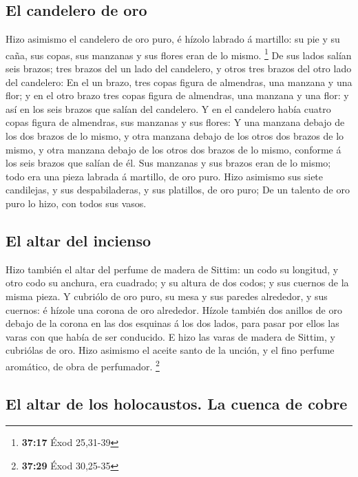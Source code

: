 \hypertarget{el-candelero-de-oro}{%
\subsection{El candelero de oro}\label{el-candelero-de-oro}}

 Hizo asimismo el candelero de oro puro, é hízolo labrado
á martillo: su pie y su caña, sus copas, sus manzanas y sus flores eran
de lo mismo. \footnote{\textbf{37:17} Éxod 25,31-39}  De
sus lados salían seis brazos; tres brazos del un lado del candelero, y
otros tres brazos del otro lado del candelero:  En el un
brazo, tres copas figura de almendras, una manzana y una flor; y en el
otro brazo tres copas figura de almendras, una manzana y una flor: y así
en los seis brazos que salían del candelero.  Y en el
candelero había cuatro copas figura de almendras, sus manzanas y sus
flores:  Y una manzana debajo de los dos brazos de lo
mismo, y otra manzana debajo de los otros dos brazos de lo mismo, y otra
manzana debajo de los otros dos brazos de lo mismo, conforme á los seis
brazos que salían de él.  Sus manzanas y sus brazos eran
de lo mismo; todo era una pieza labrada á martillo, de oro puro.
 Hizo asimismo sus siete candilejas, y sus
despabiladeras, y sus platillos, de oro puro;  De un
talento de oro puro lo hizo, con todos sus vasos.

\hypertarget{el-altar-del-incienso}{%
\subsection{El altar del incienso}\label{el-altar-del-incienso}}

 Hizo también el altar del perfume de madera de Sittim:
un codo su longitud, y otro codo su anchura, era cuadrado; y su altura
de dos codos; y sus cuernos de la misma pieza.  Y
cubriólo de oro puro, su mesa y sus paredes alrededor, y sus cuernos: é
hízole una corona de oro alrededor.  Hízole también dos
anillos de oro debajo de la corona en las dos esquinas á los dos lados,
para pasar por ellos las varas con que había de ser conducido.
 E hizo las varas de madera de Sittim, y cubriólas de
oro.  Hizo asimismo el aceite santo de la unción, y el
fino perfume aromático, de obra de perfumador. \footnote{\textbf{37:29}
  Éxod 30,25-35}

\hypertarget{el-altar-de-los-holocaustos.-la-cuenca-de-cobre}{%
\subsection{El altar de los holocaustos. La cuenca de
cobre}\label{el-altar-de-los-holocaustos.-la-cuenca-de-cobre}}

